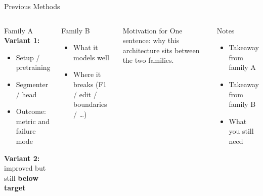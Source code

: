 \documentclass[9pt,aspectratio=169]{beamer}
\begin{document}
\begin{frame}{Previous Methods}
  \begin{columns}[T,onlytextwidth]
      \begin{block}{Family A}
        \textbf{Variant 1:}
        \begin{itemize}
          \item Setup / pretraining
          \item Segmenter / head
          \item Outcome: metric and failure mode
        \end{itemize}
        \textbf{Variant 2:} improved but still \textbf{below target}
      \end{block}

      \begin{block}{Family B}
        \begin{itemize}
          \item What it models well
          \item Where it breaks (F1 / edit / boundaries / \ldots)
        \end{itemize}
      \end{block}

      \begin{block}{Motivation for \methodname}
        One sentence: why this architecture sits between the two families.
      \end{block}

      \begin{block}{Notes}
        \scriptsize
        \vspace{-0.4em}
        \begin{itemize}
          \item Takeaway from family A
          \item Takeaway from family B
          \item What you still need
        \end{itemize}
        \vspace{-0.2em}
      \end{block}
  \end{columns}
\end{frame}
\end{document}
